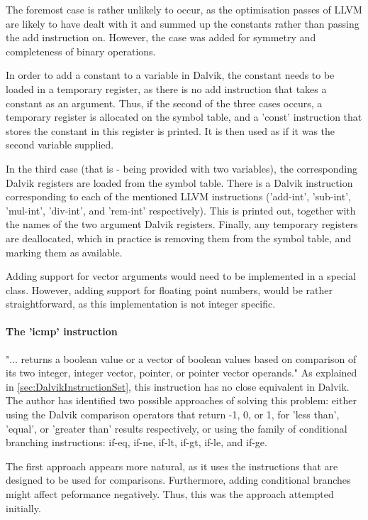 \documentclass[parskip]{cs4rep}
\begin{document}
The foremost case is rather unlikely to occur, as the optimisation passes of LLVM are likely to have dealt with it and summed up the constants rather than passing the add instruction on. However, the case was added for symmetry and completeness of binary operations.

In order to add a constant to a variable in Dalvik, the constant needs to be loaded in a temporary register, as there is no add instruction that takes a constant as an argument. Thus, if the second of the three cases occurs, a temporary register is allocated on the symbol table, and a 'const' instruction that stores the constant in this register is printed. It is then used as if it was the second variable supplied.

In the third case (that is - being provided with two variables), the corresponding Dalvik registers are loaded from the symbol table. There is a Dalvik instruction corresponding to each of the mentioned LLVM instructions ('add-int', 'sub-int', 'mul-int', 'div-int', and 'rem-int' respectively). This is printed out, together with the names of the two argument Dalvik registers. Finally, any temporary registers are deallocated, which in practice is removing them from the symbol table, and marking them as available.

Adding support for vector arguments would need to be implemented in a special class. However, adding support for floating point numbers, would be rather straightforward, as this implementation is not integer specific.

\paragraph{The 'icmp' instruction} "... returns a boolean value or a vector of boolean values based on comparison of its two integer, integer vector, pointer, or pointer vector operands."\cite{P11} As explained in \ref{sec:DalvikInstructionSet}, this instruction has no close equivalent in Dalvik. The author has identified two possible approaches of solving this problem: either using the Dalvik comparison operators that return -1, 0, or 1, for 'less than', 'equal', or 'greater than' results respectively, or using the family of conditional branching instructions: if-eq, if-ne, if-lt, if-gt, if-le, and if-ge.

The first approach appears more natural, as it uses the instructions that are designed to be used for comparisons. Furthermore, adding conditional branches might affect peformance negatively. Thus, this was the approach attempted initially.
\end{document}
